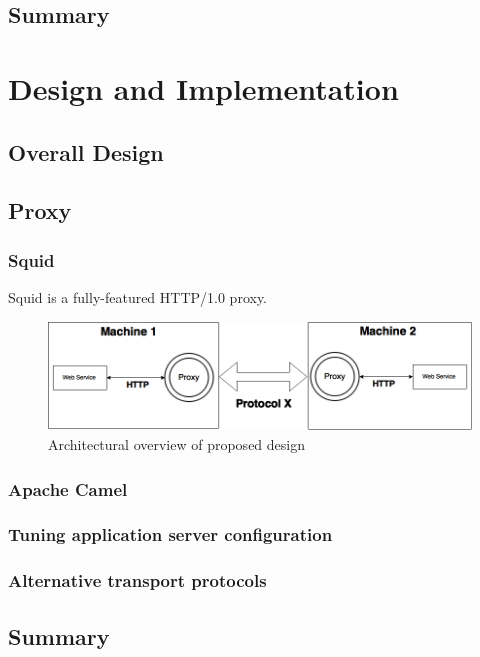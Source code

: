 \documentclass[USenglish]{ifimaster}
\begin{document}
\section{Summary}



\chapter{Design and Implementation}
\section{Overall Design}
\section{Proxy}
\subsection{Squid}
Squid is a fully-featured HTTP/1.0 proxy.
\begin{figure}[h]
\includegraphics[scale=0.4]{images/architecture.png}
\caption{Architectural overview of proposed design}
\end{figure}

\subsection{Apache Camel}

\subsection{Tuning application server configuration}

\subsection{Alternative transport protocols}

\section{Summary}
\end{document}
